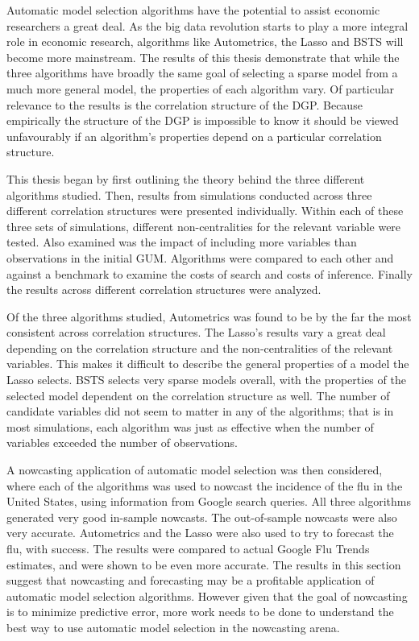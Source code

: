 Automatic model selection algorithms have the potential to assist economic researchers a great deal. As the big data revolution starts to play a more integral role in economic research, algorithms like Autometrics, the Lasso and BSTS will become more mainstream. The results of this thesis demonstrate that while the three algorithms have broadly the same goal of selecting a sparse model from a much more general model, the properties of each algorithm vary. Of particular relevance to the results is the correlation structure of the DGP. Because empirically the structure of the DGP is impossible to know it should be viewed unfavourably if an algorithm's properties depend on a particular correlation structure.

This thesis began by first outlining the theory behind the three different algorithms studied. Then, results from simulations conducted across three different correlation structures were presented individually. Within each of these three sets of simulations, different non-centralities for the relevant variable were tested. Also examined was the impact of including more variables than observations in the initial GUM. Algorithms were compared to each other and against a benchmark to examine the costs of search and costs of inference. Finally the results across different correlation structures were analyzed.   

Of the three algorithms studied, Autometrics was found to be by the far the most consistent across correlation structures. The Lasso's results vary a great deal depending on the correlation structure and the non-centralities  of the relevant variables. This makes it difficult to describe the general properties of a model the Lasso selects. BSTS selects very sparse models overall, with the properties of the selected model dependent on the correlation structure as well. The number of candidate variables did not seem to matter in any of the algorithms; that is in most simulations, each algorithm was just as effective when the number of variables exceeded the number of observations. 

A nowcasting application of automatic model selection was then considered, where each of the algorithms was used to nowcast the incidence of the flu in the United States, using information from Google search queries. All three algorithms generated very good in-sample nowcasts. The out-of-sample nowcasts were also very accurate. Autometrics and the Lasso were also used to try to forecast the flu, with success. The results were compared to actual Google Flu Trends estimates, and were shown to be even more accurate. The results in this section suggest that nowcasting and forecasting may be a profitable application of automatic model selection algorithms. However given that the goal of nowcasting is to minimize predictive error, more work needs to be done to understand the best way to use automatic model selection in the nowcasting arena.  

